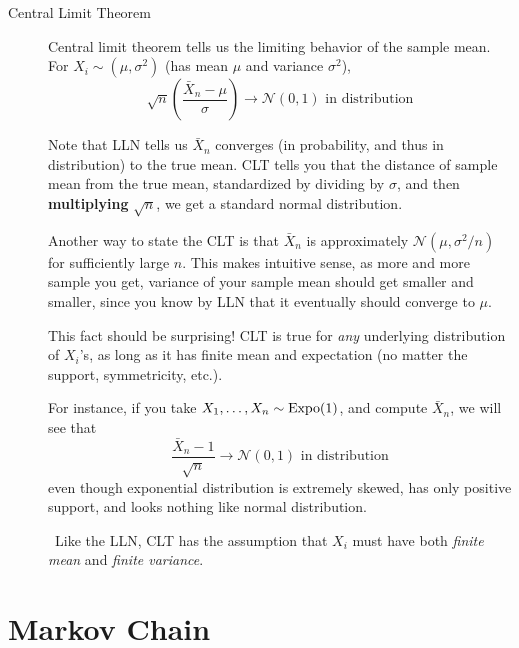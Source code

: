 \documentclass[11pt]{article}
\theoremstyle{definition}
\theoremstyle{remark}
\newcommand{\Norm}{\mathcal{N}}
\newcommand{\Expo}{\textnormal{Expo}}
\begin{document}
\begin{description}
    \item[Central Limit Theorem]

    Central limit theorem tells us the limiting behavior of the sample mean. For $X_i \sim (\mu, \sigma^2)$ (has mean $\mu$ and variance $\sigma^2$), $$ \sqrt{n} \left( \frac{\bar{X}_n - \mu}{\sigma} \right) \to \Norm(0,1) \text{ in distribution}$$

    Note that LLN tells us $\bar{X}_n$ converges (in probability, and thus in distribution) to the true mean. CLT tells you that the distance of sample mean from the true mean, standardized by dividing by $\sigma$, and then \textbf{multiplying} $\sqrt{n}$, we get a standard normal distribution.
    
    Another way to state the CLT is that $\bar{X}_n$ is approximately $\Norm(\mu, \sigma^2/n)$ for sufficiently large $n$. This makes intuitive sense, as more and more sample you get, variance of your sample mean should get smaller and smaller, since you know by LLN that it eventually should converge to $\mu$.
    
    This fact should be surprising! CLT is true for \textit{any} underlying distribution of $X_i$'s, as long as it has finite mean and expectation (no matter the support, symmetricity, etc.). 

    For instance, if you take $X_1, \ldots, X_n \sim \Expo(1)$, and compute $\bar{X}_n$, we will see that $$\frac{\bar{X}_n - 1}{\sqrt{n}} \to \Norm(0,1) \text{ in distribution} $$ even though exponential distribution is extremely skewed, has only positive support, and looks nothing like normal distribution. 

    \Biohazard \ Like the LLN, CLT has the assumption that $X_i$ must have both \textit{finite mean} and \textit{finite variance}.

\end{description}

\pagebreak

\section{Markov Chain}
\end{document}
